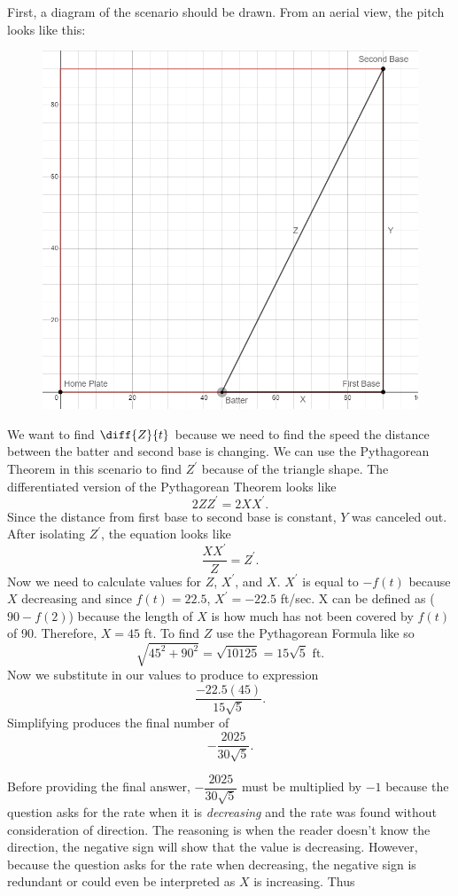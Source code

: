 \documentclass{article}
\begin{document}
\begin{enumerate}[label=\textbf{(10.\arabic*)}]
First, a diagram of the scenario should be drawn. From an aerial view, the pitch looks like this:
\begin{figure}[h]
\centering
\includegraphics[scale=.30]{graph3}
\end{figure}
\par
We want to find $\diff{Z}{t}$ because we need to find the speed the distance between the batter and second base is changing. We can use the Pythagorean Theorem in this scenario to find $Z^\prime$ because of the triangle shape. The differentiated version of the Pythagorean Theorem looks like
\[2ZZ^\prime=2XX^\prime\text{.}\]
Since the distance from first base to second base is constant, $Y$ was canceled out. After isolating $Z^\prime$, the equation looks like
\[\frac{XX^\prime}{Z}=Z^\prime\text{.}\]
Now we need to calculate values for $Z$, $X^\prime$, and $X$. $X^\prime$ is equal to $-f(t)$ because $X$ decreasing and since $f(t)=22.5$, $X^\prime=-22.5$ ft/sec. X can be defined as ($90-f(2)$) because the length of $X$ is how much has not been covered by $f(t)$ of 90. Therefore, $X=45$ ft. To find $Z$ use the Pythagorean Formula like so
\[\sqrt{45^2+90^2}=\sqrt{10125}=15\sqrt{5}\text{ ft.}\]
Now we substitute in our values to produce to expression
\[\frac{-22.5(45)}{15\sqrt5}\text{.}\]
Simplifying produces the final number of
\[-\frac{2025}{30\sqrt{5}}\text{.}\]
\par
Before providing the final answer, $-\dfrac{2025}{30\sqrt{5}}$ must be multiplied by $-1$ because the question asks for the rate when it is \textit{decreasing} and the rate was found without consideration of direction. The reasoning is when the reader doesn't know the direction, the negative sign will show that the value is decreasing. However, because the question asks for the rate when decreasing, the negative sign is redundant or could even be interpreted as $X$ is increasing. Thus

\end{enumerate}
\end{document}
